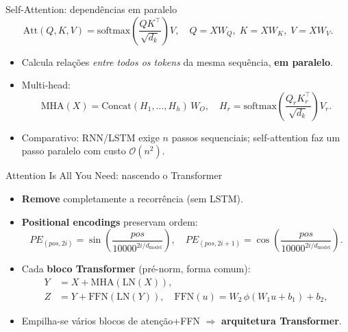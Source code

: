 \documentclass{beamer}
\begin{document}
\begin{frame}{Self-Attention: dependências em paralelo}
	\[
		\mathrm{Att}(Q,K,V)=\mathrm{softmax}\!\left(\frac{QK^\top}{\sqrt{d_k}}\right)V,
		\quad
		Q = XW_Q,\; K = XW_K,\; V = XW_V.
	\]
	\begin{itemize}
		\item Calcula relações \emph{entre todos os tokens} da mesma sequência, \textbf{em paralelo}.
		\item Multi-head:
		      \[
			      \mathrm{MHA}(X)=\mathrm{Concat}(H_1,\dots,H_h)\,W_O,\quad
			      H_r=\mathrm{softmax}\!\left(\frac{Q_r K_r^\top}{\sqrt{d_k}}\right)V_r.
		      \]
		\item Comparativo: RNN/LSTM exige $n$ passos sequenciais; self-attention faz um passo paralelo com custo $\mathcal{O}(n^2)$.
	\end{itemize}
\end{frame}

\begin{frame}{Attention Is All You Need: nascendo o Transformer}
	\begin{itemize}
		\item \textbf{Remove} completamente a recorrência (sem LSTM).
		\item \textbf{Positional encodings} preservam ordem:
		      \[
			      PE_{(pos,2i)}=\sin\!\left(\frac{pos}{10000^{2i/d_{\text{model}}}}\right),\quad
			      PE_{(pos,2i+1)}=\cos\!\left(\frac{pos}{10000^{2i/d_{\text{model}}}}\right).
		      \]
		\item Cada \textbf{bloco Transformer} (pré-norm, forma comum):
		      \[
			      \begin{aligned}
				      Y & = X + \mathrm{MHA}(\mathrm{LN}(X)),                                               \\
				      Z & = Y + \mathrm{FFN}(\mathrm{LN}(Y)),\quad \mathrm{FFN}(u)=W_2\,\phi(W_1u+b_1)+b_2,
			      \end{aligned}
		      \]
		\item Empilha-se vários blocos de atenção+FFN $\Rightarrow$ \textbf{arquitetura Transformer}.
	\end{itemize}
\end{frame}
\end{document}

